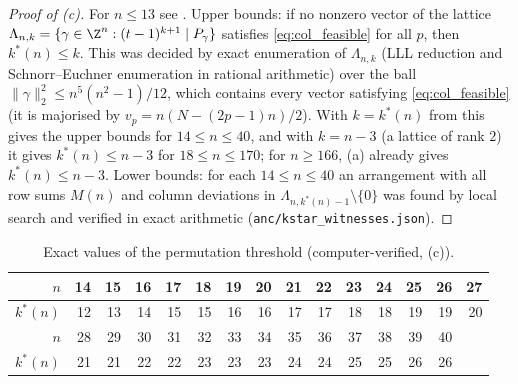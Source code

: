 \begin{proof}[Proof of (c)]
For $n\le13$ see .  Upper bounds: if no nonzero vector of the lattice
$\Lambda_{n,k}=\{\gamma\in\Z^{n}:(t-1)^{k+1}\mid P_\gamma\}$ satisfies \eqref{eq:col_feasible} for all $p$, then $k^{*}(n)\le k$.  This was
decided by exact enumeration of $\Lambda_{n,k}$ (LLL reduction and Schnorr--Euchner enumeration in rational arithmetic) over the ball
$\|\gamma\|_2^{2}\le n^{5}(n^{2}-1)/12$, which contains every vector satisfying \eqref{eq:col_feasible} (it is majorised by
$v_p=n(N-(2p-1)n)/2$).  With $k=k^{*}(n)$ from  this gives the upper bounds for $14\le n\le40$, and with $k=n-3$
(a lattice of rank $2$) it gives $k^{*}(n)\le n-3$ for $18\le n\le170$; for $n\ge166$, (a) already gives $k^{*}(n)\le n-3$.  Lower bounds: for each $14\le n\le40$ an arrangement with all
row sums $M(n)$ and column deviations in $\Lambda_{n,k^{*}(n)-1}\setminus\{0\}$ was found by local search and verified in exact
arithmetic (\texttt{anc/kstar\_witnesses.json}).
\end{proof}

\begin{table}[ht]
\centering\small
\begin{tabular}{r|rrrrrrrrrrrrrr}
$n$ & 14&15&16&17&18&19&20&21&22&23&24&25&26&27\\ \hline
$k^{*}(n)$ & 12&13&14&15&15&16&16&17&17&18&18&19&19&20\\[4pt]
$n$ & 28&29&30&31&32&33&34&35&36&37&38&39&40&\\ \hline
$k^{*}(n)$ & 21&21&22&22&23&23&23&24&24&25&25&26&26&
\end{tabular}
\caption{Exact values of the permutation threshold (computer-verified, (c)).}
\label{tab:kstar}
\end{table}


